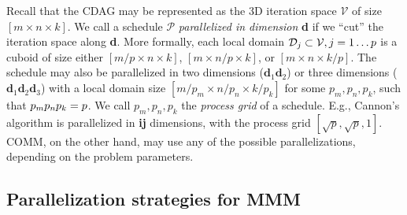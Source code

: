 \documentclass[sigplan,review,anonymous,10pt]{acmart}\settopmatter{printfolios=true,printccs=false,printacmref=false}
\newcommand\greg[1]{\textcolor{blue}{[Greg: #1]}}
\newcommand\mac[1]{\textcolor{red}{[Mac: #1]}}
\begin{document}
Recall that the CDAG may be represented as the 3D iteration space
$\mathcal{V}$ of size $[m \times n \times k]$. We call a schedule $\mathcal{P}$
\emph{parallelized in dimension} \textbf{d} if we ``cut'' the iteration space 
along \textbf{d}. More formally, each local domain $\mathcal{D}_j
\subset \mathcal{V}, j =\nobreak 1 \dots p$ is a cuboid of size either $[m/p 
\times
n \times k]$,  $[m \times
n/p \times k]$, or  $[m \times
n \times k/p]$. 
The schedule may also be parallelized in two dimensions
($\mathbf{d}_1\mathbf{d}_2$) or three dimensions
($\mathbf{d}_1\mathbf{d}_2\mathbf{d}_3$) with a local domain size $[m / p_m 
\times
n / p_n \times k / p_k]$  for some $p_m, p_n, p_k$, such that
$p_m p_n p_k = \nobreak p$. We call $p_m, p_n, p_k$ the
\emph{process grid} of a schedule. E.g., Cannon's algorithm is parallelized in 
\textbf{ij} dimensions, with the process grid $[\sqrt{p}, \sqrt{p}, 1]$. COMM, 
on the other hand, may use any of the possible parallelizations, depending on 
the problem parameters.
%




\subsection{Parallelization strategies for MMM}
\label{sec:parStrategies}
\end{document}
